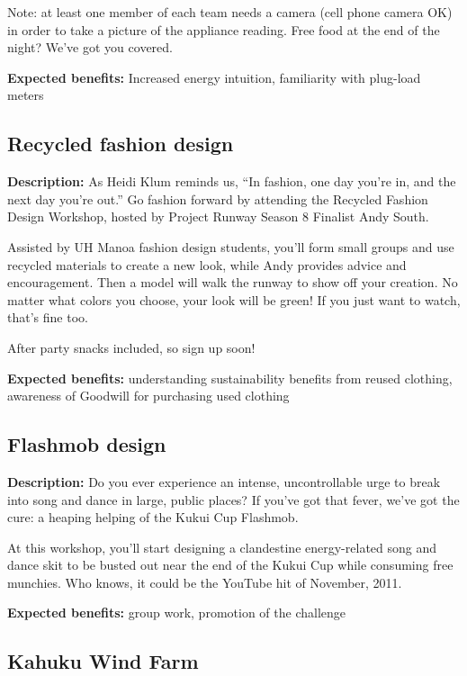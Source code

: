 Note: at least one member of each team needs a camera (cell phone camera OK) in order to take a picture of the appliance reading.  Free food at the end of the night? We've got you covered.

\vspace{2ex}
\textbf{Expected benefits:} Increased energy intuition, familiarity with plug-load meters


\subsection{Recycled fashion design}

\textbf{Description:} As Heidi Klum reminds us, ``In fashion, one day you're in, and the next day you're out.'' Go fashion forward by attending the Recycled Fashion Design Workshop, hosted by Project Runway Season 8 Finalist Andy South.

Assisted by UH Manoa fashion design students, you'll form small groups and use recycled materials to create a new look, while Andy provides advice and encouragement. Then a model will walk the runway to show off your creation. No matter what colors you choose, your look will be green! If you just want to watch, that's fine too.

After party snacks included, so sign up soon!

\vspace{2ex}
\textbf{Expected benefits:} understanding sustainability benefits from reused clothing, awareness of Goodwill for purchasing used clothing


\subsection{Flashmob design}

\textbf{Description:} Do you ever experience an intense, uncontrollable urge to break into song and dance in large, public places? If you've got that fever, we've got the cure: a heaping helping of the Kukui Cup Flashmob.

At this workshop, you'll start designing a clandestine energy-related song and dance skit to be busted out near the end of the Kukui Cup while consuming free munchies. Who knows, it could be the YouTube hit of November, 2011.

\vspace{2ex}
\textbf{Expected benefits:} group work, promotion of the challenge


\subsection{Kahuku Wind Farm}

